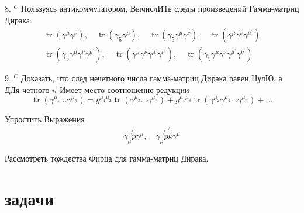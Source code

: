 \documentclass[a4paper,12pt]{article} %
\begin{document}
\begin{task}

8. $^{C}$ Пользуясь антикоммутатором, ВычислИТь следы произведений Гамма-матриц Дирака:
$$
\begin{array}{l}
\operatorname{tr}\left(\gamma^{\mu} \gamma^{\nu}\right), \quad \operatorname{tr}\left(\gamma_{5} \gamma^{\mu}\right), \quad \operatorname{tr}\left(\gamma_{5} \gamma^{\mu} \gamma^{\nu}\right), \quad \operatorname{tr}\left(\gamma^{\mu} \gamma^{\nu} \gamma^{\mu^{\prime}}\right) \\
\operatorname{tr}\left(\gamma_{5} \gamma^{\mu} \gamma^{\nu} \gamma^{\mu^{\prime}}\right), \quad \operatorname{tr}\left(\gamma^{\mu} \gamma^{\nu} \gamma^{\mu^{\prime}} \gamma^{\nu^{\prime}}\right), \quad \operatorname{tr}\left(\gamma_{5} \gamma^{\mu} \gamma^{\nu} \gamma^{\mu^{\prime}} \gamma^{\nu^{\prime}}\right)
\end{array}
$$


\end{task}



\begin{task}

9. $^{C}$ Доказать, что след нечетного числа гамма-матриц Дирака равен НулЮ, а ДЛя четного $n$ Имеет место соотношение редукции
$$
\operatorname{tr}\left(\gamma^{\mu_{1}} \ldots \gamma^{\mu_{n}}\right)=g^{\mu_{1} \mu_{2}} \operatorname{tr}\left(\gamma^{\mu_{3}} \ldots \gamma^{\mu_{n}}\right)+g^{\mu_{1} \mu_{3}} \operatorname{tr}\left(\gamma^{\mu_{2}} \gamma^{\mu_{4}} \ldots \gamma^{\mu_{n}}\right)+\ldots
$$


\end{task}



\begin{task}

Упростить Выражения
$$
\gamma_{\mu} \not{p} \gamma^{\mu}, \quad \gamma_{\mu} \not{p} \not{k} \gamma^{\mu}
$$


\end{task}



\begin{task}

Рассмотреть тождества Фирца для гамма-матриц Дирака.


\end{task}


\section{задачи}
\end{document}
